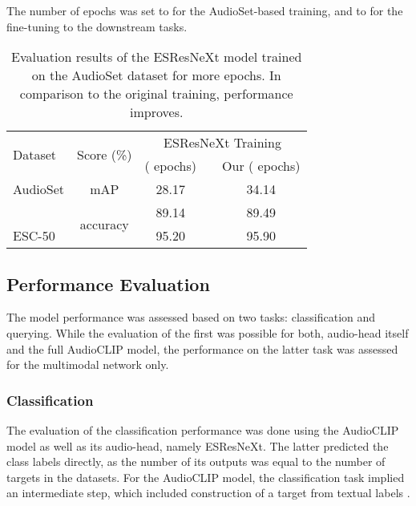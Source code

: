 \documentclass[runningheads]{llncs}
\newcommand{\ra}[1]{\renewcommand{\arraystretch}{#1}}
\begin{document}
The number of epochs was set to  for the \mbox{AudioSet}-based training, and to  for the fine-tuning to the downstream tasks.

\begin{table}[tbp]
\begin{threeparttable}[t]
\caption{Evaluation results of the \mbox{ESResNeXt} model trained on the \mbox{AudioSet} dataset for more epochs. In comparison to the original training, performance improves.}
\label{tbl:clf:esrnx}
\ra{1.0}
\begin{tabularx}{\linewidth}{lXccc}
\toprule
\multicolumn{1}{l}{\multirow{2}{*}{Dataset}} & \multicolumn{1}{c}{\multirow{2}{*}{Score (\%)}} & \multicolumn{3}{c}{ESResNeXt Training} \\
\cmidrule{3-5}
 & & \multicolumn{1}{c}{\cite{guzhov2021esrnx} ( epochs)} & \multicolumn{1}{c}{\qquad\qquad} & \multicolumn{1}{c}{Our ( epochs)} \\
\midrule
\multicolumn{1}{l}{AudioSet} & \multicolumn{1}{c}{mAP} & \multicolumn{1}{c}{28.17} & & \multicolumn{1}{c}{34.14} \\
\addlinespace[0.5em]
\multicolumn{1}{l}{UrbanSound8K} & \multicolumn{1}{c}{\multirow{2}{*}{accuracy}} & \multicolumn{1}{c}{89.14} & & \multicolumn{1}{c}{89.49} \\
\multicolumn{1}{l}{ESC-50} & & \multicolumn{1}{c}{95.20} & & \multicolumn{1}{c}{95.90} \\
\bottomrule
\end{tabularx}
\end{threeparttable}
\end{table}

\subsection{Performance Evaluation} \label{sec:exp_setup:infer}
The model performance was assessed based on two tasks: classification and querying.
While the evaluation of the first was possible for both, audio-head itself and the full \mbox{AudioCLIP} model, the performance on the latter task was assessed for the multimodal network only.

\subsubsection{Classification} \label{sec:exp_setup:infer:clf}
The evaluation of the classification performance was done using the \mbox{AudioCLIP} model as well as its audio-head, namely \mbox{ESResNeXt}.
The latter predicted the class labels directly, as the number of its outputs was equal to the number of targets in the datasets.
For the \mbox{AudioCLIP} model, the classification task implied an intermediate step, which included construction of a target from textual labels \cite{radford2021clip}.
\end{document}
